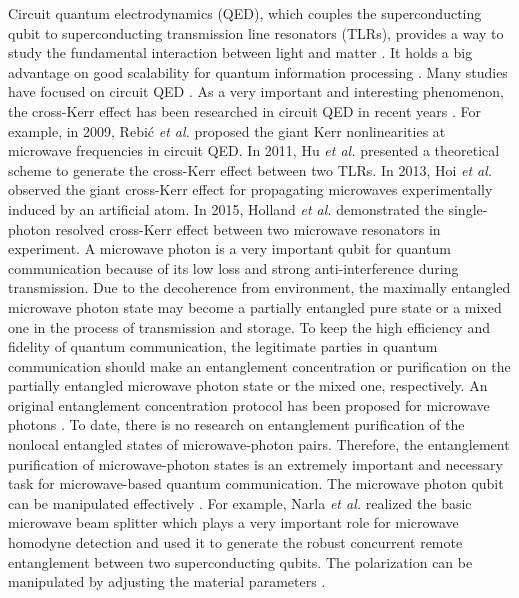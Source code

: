 \documentclass[showpacs,aps,graphicx,twocolumn]{revtex4}
\begin{document}
Circuit quantum electrodynamics (QED), which couples the
superconducting qubit to superconducting transmission line
resonators (TLRs), provides a way to study the fundamental
interaction between light and matter \cite{ABlais,AWallraff}. It
holds a big advantage on good scalability for quantum information
processing
\cite{ABlais2,DiCarlo,LongcircuitPRA,Wangsuperconducting,circuitTianlPRL,3q,3q1,RVijaynature,Frederick1}.
Many studies have focused on circuit QED
\cite{AAHouck,MHofheinz,JMajer,DISchuster,BRJohnson,HuaMPRA,Narlaprx2016}. As a
very important and interesting phenomenon, the cross-Kerr effect has been
researched in circuit QED in recent years
\cite{SRebic2009,SKumarPRB2010,YHu,GKirchmair,ICHoi,ETHolland}. For
example, in 2009, Rebi\'{c} \emph{et al.} \cite{SRebic2009} proposed
the giant Kerr nonlinearities at microwave frequencies in circuit
QED. In 2011, Hu \emph{et al.} \cite{YHu} presented a theoretical
scheme to generate the cross-Kerr effect between two TLRs. In 2013,
Hoi \emph{et al.} \cite{ICHoi} observed the giant cross-Kerr effect
for propagating microwaves experimentally induced by an artificial atom. In 2015, Holland \emph{et al.} \cite{ETHolland}
demonstrated the single-photon resolved cross-Kerr effect between
two microwave resonators in experiment. A microwave photon is a very
important qubit for quantum communication because of its low loss and strong
anti-interference during transmission. Due to the decoherence from
environment, the maximally entangled microwave photon state may
become a partially entangled pure state or a mixed one in the
process of transmission and storage. To keep the high
efficiency and fidelity of quantum communication, the  legitimate
parties in quantum communication should make an entanglement
concentration or purification on the partially entangled microwave
photon state or the mixed one, respectively. An original
entanglement concentration protocol has been proposed for microwave
photons \cite{HZhangPRA2017}. To date,  there is no research on
entanglement purification of the nonlocal  entangled states of
microwave-photon pairs. Therefore, the entanglement purification of
microwave-photon states is an extremely important and necessary task
for microwave-based quantum communication. The microwave photon qubit can
be manipulated effectively \cite{Narlaprx2016,JMHao,DRSolli1}. For example, Narla \emph{et al.} \cite{Narlaprx2016} realized the basic microwave beam splitter which plays a very important role for microwave homodyne detection and used it to generate the robust concurrent remote entanglement between two superconducting qubits. The polarization can be manipulated by adjusting the material parameters \cite{JMHao,DRSolli1}.
\end{document}

